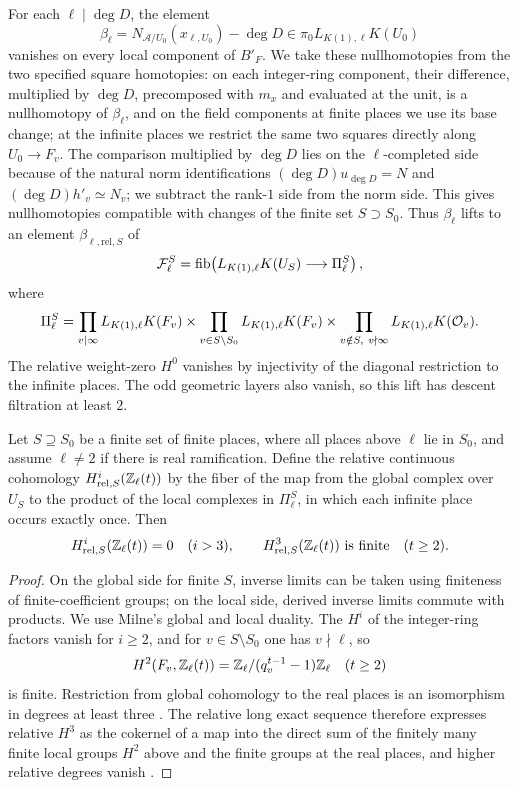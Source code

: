 For each $\ell\mid \deg D$, the element
\[
 \beta_\ell=N_{\mathcal A/U_0}(x_{\ell,U_0})-\deg D\in\pi_0L_{K(1),\ell}K(U_0)
\]
vanishes on every local component of $B'_F$.
We take these nullhomotopies from the two specified square homotopies: on each integer-ring component, their difference, multiplied by $\deg D$, precomposed with $m_x$ and evaluated at the unit, is a nullhomotopy of $\beta_\ell$, and on the field components at finite places we use its base change; at the infinite places we restrict the same two squares directly along $U_0\to F_v$.
The comparison multiplied by $\deg D$ lies on the $\ell$-completed side because of the natural norm identifications $(\deg D)u_{\deg D}=N$ and $(\deg D)h'_v\simeq N_v$; we subtract the rank-$1$ side from the norm side.
This gives nullhomotopies compatible with changes of the finite set $S\supset S_0$.
Thus $\beta_\ell$ lifts to an element $\beta_{\ell,\mathrm{rel},S}$ of
\[
 \mathcal F_\ell^S=\operatorname{fib}\!\left(
 L_{K(1),\ell}K(U_S)\longrightarrow \Pi_\ell^S\right),
\]
where
\[
 \Pi_\ell^S=
 \prod_{v\mid\infty}L_{K(1),\ell}K(F_v)
 \times\prod_{v\in S\setminus S_0}L_{K(1),\ell}K(F_v)
 \times\prod_{v\notin S,\ v\nmid\infty}
                         L_{K(1),\ell}K(\mathcal O_v).
\]
The relative weight-zero $H^0$ vanishes by injectivity of the diagonal restriction to the infinite places.
The odd geometric layers also vanish, so this lift has descent filtration at least $2$.

\begin{lemma}\label{lem:paper-lca-relative-cohomology}
Let $S\supseteq S_0$ be a finite set of finite places, where all places above $\ell$ lie in $S_0$, and assume $\ell\ne2$ if there is real ramification.
Define the relative continuous cohomology $H^i_{\mathrm{rel},S}(\mathbb Z_\ell(t))$ by the fiber of the map from the global complex over $U_S$ to the product of the local complexes in $\Pi_\ell^S$, in which each infinite place occurs exactly once.
Then
\[
 H^i_{\mathrm{rel},S}(\mathbb Z_\ell(t))=0\quad(i>3),\qquad
 H^3_{\mathrm{rel},S}(\mathbb Z_\ell(t))\text{ is finite}\quad(t\ge2).
\]
\end{lemma}
\begin{proof}
On the global side for finite $S$, inverse limits can be taken using finiteness of finite-coefficient groups; on the local side, derived inverse limits commute with products.
We use Milne's global and local duality.
The $H^i$ of the integer-ring factors vanish for $i\ge2$, and for $v\in S\setminus S_0$ one has $v\nmid\ell$, so
\[
 H^2(F_v,\mathbb Z_\ell(t))=
 \mathbb Z_\ell/(q_v^{t-1}-1)\mathbb Z_\ell\quad(t\ge2)
\]
is finite.
Restriction from global cohomology to the real places is an isomorphism in degrees at least three \cite[I, Theorem 4.10(c)]{MilneADT}.
The relative long exact sequence therefore expresses relative $H^3$ as the cokernel of a map into the direct sum of the finitely many finite local groups $H^2$ above and the finite groups at the real places, and higher relative degrees vanish \cite[I, Theorem 4.10 and Corollary 4.16]{MilneADT}.
\end{proof}

